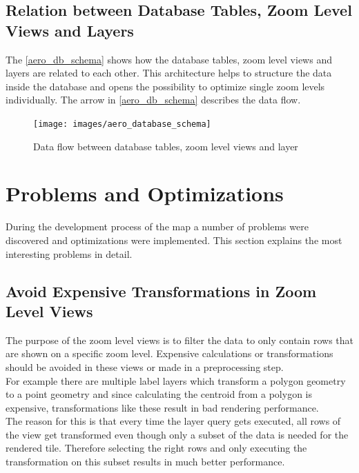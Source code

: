 \subsection{Relation between Database Tables, Zoom Level Views and Layers}

The \autoref{aero_db_schema} shows how the database tables, zoom level views and layers are related to each other. This architecture helps to structure the \osm{} data inside the database and opens the possibility to optimize single zoom levels individually. The arrow in \autoref{aero_db_schema} describes the data flow.

\begin{figure}[H]
\centering
\texttt{[image: images/aero\_database\_schema]}
\caption{Data flow between database tables, zoom level views and layer}
\label{aero_db_schema}
\end{figure}

\section{Problems and Optimizations}

During the development process of the map a number of problems were discovered and optimizations were implemented. This section explains the most interesting problems in detail.

\subsection{Avoid Expensive Transformations in Zoom Level Views}

The purpose of the zoom level views is to filter the data to only contain rows that are shown on a specific zoom level. Expensive calculations or transformations should be avoided in these views or made in a preprocessing step.\\

For example there are multiple label layers which transform a polygon geometry to a point geometry and since calculating the centroid from a polygon is expensive, transformations like these result in bad rendering performance.\\
The reason for this is that every time the layer query gets executed, all rows of the view get transformed even though only a subset of the data is needed for the rendered tile. Therefore selecting the right rows and only executing the transformation on this subset results in much better performance.



